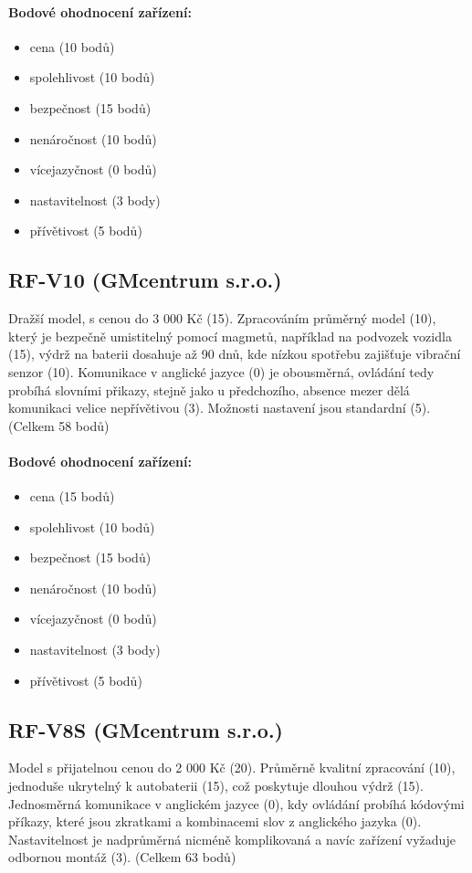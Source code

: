 \documentclass[FM,BP]{tulthesis}  %
\begin{document}
\paragraph{Bodové ohodnocení zařízení:}
\begin{itemize}
\item cena (10 bodů)
\item spolehlivost (10 bodů)
\item bezpečnost (15 bodů)
\item nenáročnost (10 bodů)
\item vícejazyčnost (0 bodů)
\item nastavitelnost (3 body)
\item přívětivost (5 bodů)
\end{itemize}

\subsection{RF-V10 (GMcentrum s.r.o.)}
Dražší model, s cenou do 3 000 Kč (15). Zpracováním průměrný model (10), který je bezpečně umistitelný pomocí magmetů, například na podvozek vozidla (15), výdrž na baterii dosahuje až 90 dnů, kde nízkou spotřebu zajišťuje vibrační senzor (10). Komunikace v anglické jazyce (0) je obousměrná, ovládání tedy probíhá slovními přikazy, stejně jako u předchozího, absence mezer dělá komunikaci velice nepřívětivou (3). Možnosti nastavení jsou standardní (5). (Celkem 58 bodů)

\paragraph{Bodové ohodnocení zařízení:}
\begin{itemize}
\item cena (15 bodů)
\item spolehlivost (10 bodů)
\item bezpečnost (15 bodů)
\item nenáročnost (10 bodů)
\item vícejazyčnost (0 bodů)
\item nastavitelnost (3 body)
\item přívětivost (5 bodů)
\end{itemize}

\subsection{RF-V8S (GMcentrum s.r.o.)}
Model s přijatelnou cenou do 2 000 Kč (20). Průměrně kvalitní zpracování (10), jednoduše ukrytelný k autobaterii (15), což poskytuje dlouhou výdrž (15). Jednosměrná komunikace v anglickém jazyce (0), kdy ovládání probíhá kódovými příkazy, které jsou zkratkami a kombinacemi slov z anglického jazyka (0). Nastavitelnost je nadprůměrná nicméně komplikovaná a navíc zařízení vyžaduje odbornou montáž (3). (Celkem 63 bodů)
\end{document}
